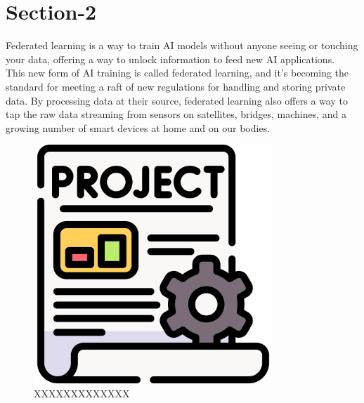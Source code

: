 \documentclass[12pt]{report}
\begin{document}
\section{Section-2}
\bigskip
\begin{minipage}{0.5\textwidth}
    \raggedright
    Federated learning is a way to train AI models without anyone seeing or touching your data, offering a way to unlock information to feed new AI applications.\\
    \vspace{0.5cm}
    This new form of AI training is called federated learning, and it’s becoming the standard for meeting a raft of new regulations for handling and storing private data. By processing data at their source, federated learning also offers a way to tap the raw data streaming from sensors on satellites, bridges, machines, and a growing number of smart devices at home and on our bodies.

\end{minipage}%
\hspace{1cm}
\begin{minipage}{0.5\textwidth}
    \raggedleft
    \begin{figure}[H] %
    \centering
        \includegraphics[width=90mm]{project.png} %
        \caption{XXXXXXXXXXXXX}
        \label{fig:img-2}
    \end{figure}
\end{minipage}

\bigskip
\end{document}
